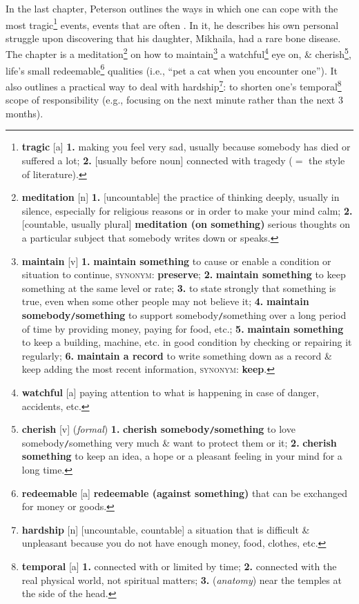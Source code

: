 \documentclass{article}
\begin{document}
In the last chapter, Peterson outlines the ways in which one can cope with the most tragic\footnote{\textbf{tragic} [a] \textbf{1.} making you feel very sad, usually because somebody has died or suffered a lot; \textbf{2.} [usually before noun] connected with tragedy ($=$ the style of literature).} events, events that are often . In it, he describes his own personal struggle upon discovering that his daughter, Mikhaila, had a rare bone disease. The chapter is a meditation\footnote{\textbf{meditation} [n] \textbf{1.} [uncountable] the practice of thinking deeply, usually in silence, especially for religious reasons or in order to make your mind calm; \textbf{2.} [countable, usually plural] \textbf{meditation (on something)} serious thoughts on a particular subject that somebody writes down or speaks.} on how to maintain\footnote{\textbf{maintain} [v] \textbf{1.} \textbf{maintain something} to cause or enable a condition or situation to continue, \textsc{synonym}: \textbf{preserve}; \textbf{2.} \textbf{maintain something} to keep something at the same level or rate; \textbf{3.} to state strongly that something is true, even when some other people may not believe it; \textbf{4.} \textbf{maintain somebody{\tt/}something} to support somebody{\tt/}something over a long period of time by providing money, paying for food, etc.; \textbf{5.} \textbf{maintain something} to keep a building, machine, etc. in good condition by checking or repairing it regularly; \textbf{6.} \textbf{maintain a record} to write something down as a record \& keep adding the most recent information, \textsc{synonym}: \textbf{keep}.} a watchful\footnote{\textbf{watchful} [a] paying attention to what is happening in case of danger, accidents, etc.} eye on, \& cherish\footnote{\textbf{cherish} [v] (\textit{formal}) \textbf{1.} \textbf{cherish somebody{\tt/}something} to love somebody{\tt/}something very much \& want to protect them or it; \textbf{2.} \textbf{cherish something} to keep an idea, a hope or a pleasant feeling in your mind for a long time.}, life's small redeemable\footnote{\textbf{redeemable} [a] \textbf{redeemable (against something)} that can be exchanged for money or goods.} qualities (i.e., ``pet a cat when you encounter one''). It also outlines a practical way to deal with hardship\footnote{\textbf{hardship} [n] [uncountable, countable] a situation that is difficult \& unpleasant because you do not have enough money, food, clothes, etc.}: to shorten one's temporal\footnote{\textbf{temporal} [a] \textbf{1.} connected with or limited by time; \textbf{2.} connected with the real physical world, not spiritual matters; \textbf{3.} (\textit{anatomy}) near the temples at the side of the head.} scope of responsibility (e.g., focusing on the next minute rather than the next 3 months).
\end{document}
